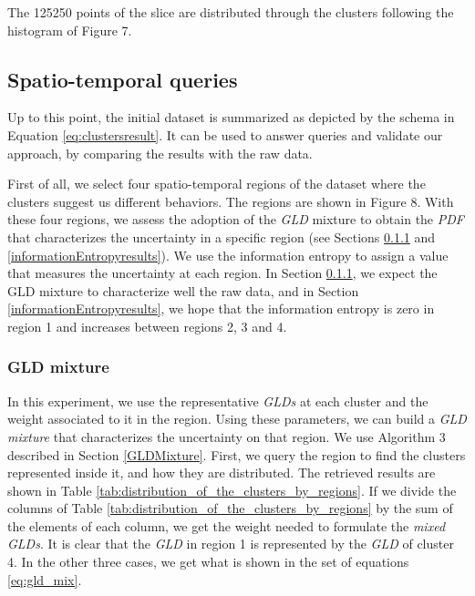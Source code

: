 \documentclass[11pt]{article}
\begin{document}
The 125250 points of the slice are distributed through the clusters following the histogram of Figure 7.

\subsection{Spatio-temporal queries}
Up to this point, the initial dataset is summarized as depicted by the schema in Equation \ref{eq:clustersresult}. It can be used to answer queries and validate our approach, by comparing the results with the raw data.

First of all, we select four spatio-temporal regions of the dataset where the clusters suggest us different behaviors. The regions are shown in Figure 8. 
With these four regions, we assess the adoption of the \textit{GLD} mixture to obtain the \textit{PDF} that characterizes the uncertainty in a specific  region (see Sections \ref{GLDmixtureresults} and \ref{informationEntropyresults}). We use the information entropy to assign a value that measures the uncertainty at each region. In Section \ref{GLDmixtureresults}, we expect the GLD mixture to characterize well the raw data, and in Section \ref{informationEntropyresults}, we hope that the information entropy is zero in region 1 and increases between regions 2, 3 and 4.

\subsubsection{GLD mixture}\label{GLDmixtureresults}
In this experiment, we use the representative \textit{GLDs} at each cluster and the weight associated to it in the region. Using these parameters, we can build a \textit{GLD mixture} that characterizes the uncertainty on that region. We use
Algorithm 3 described in Section \ref{GLDMixture}. First, we query the region to find  the clusters represented inside it, and how they are distributed. The retrieved results are shown in Table \ref{tab:distribution_of_the_clusters_by_regions}. If we divide the columns of Table \ref{tab:distribution_of_the_clusters_by_regions} by the sum of the elements of each column, we get the weight needed to formulate the \textit{mixed GLDs}. It is clear that the \textit{GLD} in region 1 is represented by the \textit{GLD} of cluster 4. In the other three cases, we get what is shown in the set of 
equations \ref{eq:gld_mix}.
\end{document}
